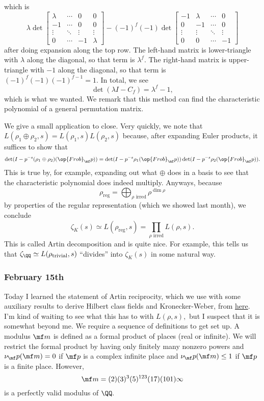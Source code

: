 which is
\[\lambda\det\begin{bmatrix}
    \lambda & \cdots & 0 & 0 \\
    -1 & \cdots & 0 & 0 \\
    \vdots & \ddots & \vdots & \vdots \\
    0 & \cdots & -1 & \lambda
\end{bmatrix}-(-1)^f(-1)\det\begin{bmatrix}
    -1 & \lambda & \cdots & 0 \\
    0 & -1 & \cdots & 0 \\
    \vdots & \vdots & \ddots & \vdots\\
    0 & 0 & \cdots & -1
\end{bmatrix}\]
after doing expansion along the top row. The left-hand matrix is lower-triangle with $\lambda$ along the diagonal, so that term is $\lambda^f.$ The right-hand matrix is upper-triangle with $-1$ along the diagonal, so that term is $(-1)^f(-1)(-1)^{f-1}=1.$ In total, we see
\[\det(\lambda I-C_f)=\lambda^f-1,\]
which is what we wanted. We remark that this method can find the characteristic polynomial of a general permutation matrix.

We give a small application to close. Very quickly, we note that $L(\rho_1\oplus\rho_2,s)=L(\rho_1,s)L(\rho_2,s)$ because, after expanding Euler products, it suffices to show that
\[\det(I-p^{-s}(\rho_1\oplus\rho_2)(\op{Frob}_\mf p))=\det(I-p^{-s}\rho_1(\op{Frob}_\mf p))\det(I-p^{-s}\rho_2(\op{Frob}_\mf p)).\]
This is true by, for example, expanding out what $\oplus$ does in a basis to see that the characteristic polynomial does indeed multiply. Anyways, because
\[\rho_{\text{reg}}=\bigoplus_{\rho\text{ irred}}\rho^{\dim\rho}\]
by properties of the regular representation (which we showed last month), we conclude
\[\zeta_K(s)\simeq L(\rho_{\text{reg}},s)=\prod_{\rho\text{ irred}}L(\rho,s).\]
This is called Artin decomposition and is quite nice. For example, this tells us that $\zeta_\QQ\simeq L(\rho_{\text{trivial}},s)$ ``divides'' into $\zeta_K(s)$ in some natural way.

\subsubsection{February 15th}
Today I learned the statement of Artin reciprocity, which we use with some auxiliary results to derive Hilbert class fields and Kronecker-Weber, from \href{https://usamo.wordpress.com/2016/05/03/artin-reciprocity/}{here}. I'm kind of waiting to see what this has to with $L(\rho,s),$ but I suspect that it is somewhat beyond me. We require a sequence of definitions to get set up. A modulus $\mf m$ is defined as a formal product of places (real or infinite). We will restrict the formal product by having only finitely many nonzero powers and $\nu_\mf p(\mf m)=0$ if $\mf p$ is a complex infinite place and $\nu_\mf p(\mf m)\le1$ if $\mf p$ is a finite place. However,
\[\mf m=(2)(3)^3(5)^{123}(17)(101)\infty\]
is a perfectly valid modulus of $\QQ.$

